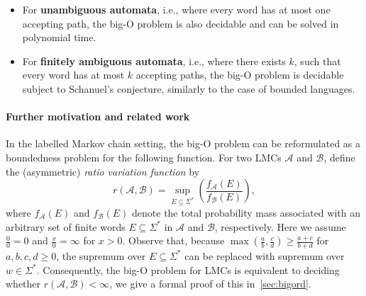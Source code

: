 \documentclass{lmcs}
\theoremstyle{plain}
\theoremstyle{definition}
\theoremstyle{remark}
\newcommand\pbra[1]{\left( #1 \right)}
\newcommand\tvra{\mathit{r}}
\begin{document}
\begin{itemize}
Bounded languages form a well-known subclass of regular languages.
In fact, a regular (or even context-free) language $L$ is bounded if and only if the number of
words of length~$n$ in $L$ is at most polynomial in~$n$. All other regular
languages have, in contrast, exponential growth rate
(a fact rediscovered multiple times; see, e.g., references in Gawrychowski et~al.~\cite{GawrychowskiKRS10}).
Bounded languages have been studied from combinatorial and algorithmic points
of view since the 1960s~\cite{ginsburg1964bounded,GawrychowskiKRS10},
and have recently been used, e.g., in the analysis of
quantitative information flow problems in computer security~\cite{Mestel19fsttcs,Mestel19csf}.
In the context of labelled Markov chains,
languages that are subsets of $a_1^* a_2^* \ldots a_m^*$ (for individual
letters $a_1, \ldots, a_m \in \Sigma$) model consecutive arrival of $m$~events
in a discrete-time system. It is curious that natural decision problems
for such simple systems can lead to intricate algorithmic questions in number theory
at the border of decidability.
\item
For \textbf{unambiguous automata}, i.e., where every word has at most one accepting
path, the big-O problem is also decidable and can be solved in polynomial time.
\item
For \textbf{finitely ambiguous automata}, i.e., where there exists $k$, such that every word has at most $k$ accepting
paths, the big-O problem is decidable subject to Schanuel's conjecture, similarly to the case of bounded languages.
\end{itemize}

\paragraph*{Further motivation and related work}

In the labelled Markov chain setting,
the big-O problem can be reformulated as a boundedness problem for the following function.
For two LMCs $\mathcal A$ and $\mathcal B$, define
the (asymmetric) \emph{ratio variation function} by
\[\tvra(\mathcal A, \mathcal B) = \sup_{E \subseteq \Sigma^*} \pbra{\frac{f_{\mathcal A}(E) }{ f_{\mathcal B}(E)}},\]
where $f_{\mathcal A}(E)$ and $f_{\mathcal B}(E)$ denote the total probability mass associated with
an arbitrary set of finite words $E \subseteq \Sigma^*$ in $\mathcal A$ and $\mathcal B$, respectively.
Here we assume $\frac{0}{0}=0$ and $\frac{x}{0}=\infty$ for $x>0$.
Observe that, because $\max(\frac{a}{b},\frac{c}{d}) \ge \frac{a+c}{b+d}$ for $a,b,c,d\ge 0$, the supremum over $E \subseteq \Sigma^*$
can be replaced with supremum over $w\in \Sigma^*$. Consequently, the big-O problem for LMCs is equivalent to deciding whether $\tvra(\mathcal A, \mathcal B) <\infty$, we give a formal proof of this in~\cref{sec:bigord}.
\end{document}
